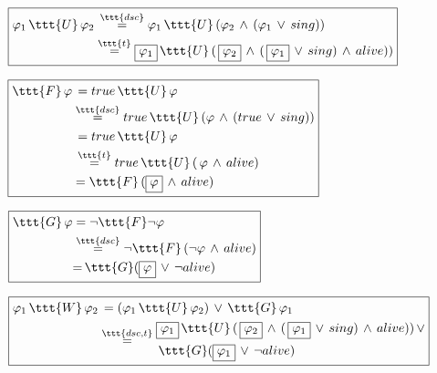 \documentclass[11pt]{article}
\begin{document}
$\boxed{\begin{aligned}
            \varphi_1\,\ttt{U}\,\varphi_2 &\,\overset{\ttt{dsc}}{=} \varphi_1\,\ttt{U}\,(\varphi_2\,\land\,(\varphi_1\,\lor\,sing))\\
            &\overset{\ttt{t}}{=} \boxed{\varphi_1}\,\ttt{U}\,(\,\boxed{\varphi_2}\,\land\,(\,\boxed{\varphi_1}\,\lor\,sing)\,\land\,alive))
\end{aligned}}$

\vspace{0.25cm}

$\boxed{\begin{aligned}
     \ttt{F}\,\varphi &\,= true\,\ttt{U}\,\varphi \\
     &\overset{\ttt{dsc}}{=} true\,\ttt{U}\,(\varphi\,\land\,(true\,\lor\, sing)) \\
     &\,= true\,\ttt{U}\,\varphi \\
     &\,\overset{\ttt{t}}{=} true\,\ttt{U}\,(\,\varphi\,\land\,alive) \\
     & = \ttt{F}\,(\boxed{\varphi}\,\land\,alive)
\end{aligned}}$

\vspace{0.25cm}

$\boxed{\begin{aligned}
      \ttt{G}\,\varphi &= \neg \ttt{F}\neg \varphi \\
      &\overset{\ttt{dsc}}{=} \neg \ttt{F}\,(\neg\varphi\,\land\,alive) \\
      &{=}\, \ttt{G}(\boxed{\varphi}\,\lor\,\neg alive)
\end{aligned}}$

\vspace{0.25cm}

$\boxed{\begin{aligned}
            \varphi_1\,\ttt{W}\,\varphi_2 &\,= (\varphi_1\,\ttt{U}\,\varphi_2)\,\lor\,\ttt{G}\,\varphi_1 \\
            &\overset{\ttt{dsc,t}}{=} \begin{aligned}
                                          &\boxed{\varphi_1}\,\ttt{U}\,(\,\boxed{\varphi_2}\,\land\,(\,\boxed{\varphi_1}\,\lor\,sing)\,\land\,alive))\,\lor\\
                                          &\,\ttt{G}(\boxed{\varphi_1}\,\lor\,\neg alive)
            \end{aligned}
\end{aligned}}$

\vspace{0.25cm}
\end{document}
